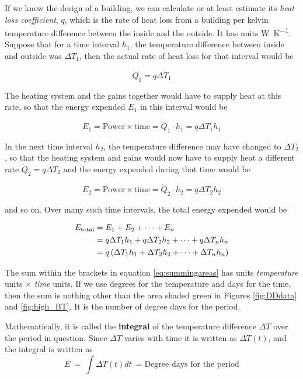 \documentclass[parskip=half]{scrartcl}
\begin{document}
If we know the design of a building, we can calculate or at least estimate its \emph{heat loss coefficient}, $q$, which is the rate of heat loss from a building per kelvin temperature difference between the inside and the outside. It has units \si{\watt\per\kelvin}. Suppose that for a time interval $h_1$, the temperature difference between inside and outside was $\Delta T_1$, then the actual rate of heat loss for that interval would be

\begin{equation}
\dot Q_1 = q\Delta T_1
\end{equation}

The heating system and the gains together would have to supply heat at this rate, so that the energy expended $E_1$ in this interval would be 

\begin{equation}
E_1=\text{Power}\times \text{time}=\dot Q_1\cdot h_1 = q\Delta T_1 h_1
\end{equation}

In the next time interval $h_2$, the temperature difference may have changed to $\Delta T_2$, so that the heating system and gains would now have to supply heat a different rate $\dot Q_2=q\Delta T_2$ and the energy expended during that time would be 

\begin{equation}
E_2=\text{Power}\times \text{time}=\dot Q_2\cdot h_2 = q\Delta T_2 h_2
\end{equation}

and so on. Over many such time intervals, the total energy expended would be


\begin{align} 
\label{eq:summingareas}
E_\text{total}&= E_1+E_2+\dots +E_n\notag\\
&= q\Delta T_1 h_1 + q\Delta T_2 h_2 +\dots+q\Delta T_n h_n\notag\\
&=q\left(\Delta T_1 h_1 + \Delta T_2 h_2 +\dots+\Delta T_n h_n\right)
\end{align}

The sum within the brackets in equation \eqref{eq:summingareas} has units \textit{temperature } units $\times$ \textit{time} units. If we use degrees for the temperature and days for the time, then the sum is nothing other than the area shaded green in Figures \ref{fig:DDdata}  and \ref{fig:high_BT}. It is the number of degree days for the period. 

Mathematically, it is called the \textbf{integral} of the temperature difference $\Delta T$ over the period in question. Since $\Delta T$ varies with time it is written as $\Delta T(t)$, and the integral is written as
\begin{equation}
E\ =\ \int{\Delta T(t) dt}\ =\text{Degree\ days\ for\ the\ period}
\label{eq:DD_integral}
\end{equation}
\end{document}
